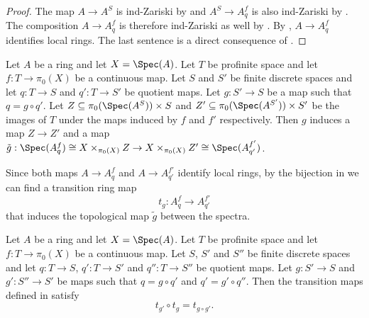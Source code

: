 \begin{proof}
  \leanok
  The map $A \to A^S$ is ind-Zariski by  and $A^S \to A^f_{q}$ is also ind-Zariski by .  The composition $A \to A^f_{q}$ is therefore ind-Zariski as well by . By , $A \to A^f_{q}$ identifies local rings. The last sentence is a direct consequence of .
\end{proof}

\begin{definition}
  \label{def:modify-pi0-transition-map}
  Let $A$ be a ring and let $X = \Spec (A)$. Let $T$ be profinite space and let $f : T \to \pi_0(X)$ be a continuous map. Let \(S\) and \(S'\) be finite discrete spaces and let \(q : T \to S\) and \(q' : T \to S'\) be quotient maps. Let \(g : S' \to S\) be a map such that \(q = g \circ q'\). Let \(Z \subseteq \pi_0(\Spec (A^{S})) \times S\) and \(Z' \subseteq \pi_0(\Spec (A^{S'})) \times S'\) be the images of \(T\) under the maps induced by \(f\) and \(f'\) respectively. Then \(g\) induces a map \(Z \to Z'\) and a map \(\tilde{g} : \Spec (A^f_{q}) \cong X \times_{\pi_0(X)} Z \to X \times_{\pi_0(X)} Z' \cong \Spec (A^{f'}_{q'})\).

  Since both maps \(A \to A^f_{q}\) and \(A \to A^{f'}_{q'}\) identify local rings, by the bijection in  we can find a transition ring map
  \[t_{g}: A^f_{q} \to A^{f'}_{q'}\]
  that induces the topological map \(\tilde{g}\) between the spectra.
\end{definition}

\begin{lemma}
  \label{thm:modify-pi0-transition-map-compatible}
  Let $A$ be a ring and let $X = \Spec (A)$. Let $T$ be profinite space and let $f : T \to \pi_0(X)$ be a continuous map. Let \(S\), \(S'\) and \(S''\) be finite discrete spaces and let \(q : T \to S\), \(q' : T \to S'\) and \(q'' : T \to S''\) be quotient maps. Let \(g : S' \to S\) and \(g' : S'' \to S'\) be maps such that \(q = g \circ q'\) and \(q' = g' \circ q''\). Then the transition maps defined in  satisfy
  \[t_{g'} \circ t_{g} = t_{g \circ g'}.\]
\end{lemma}

